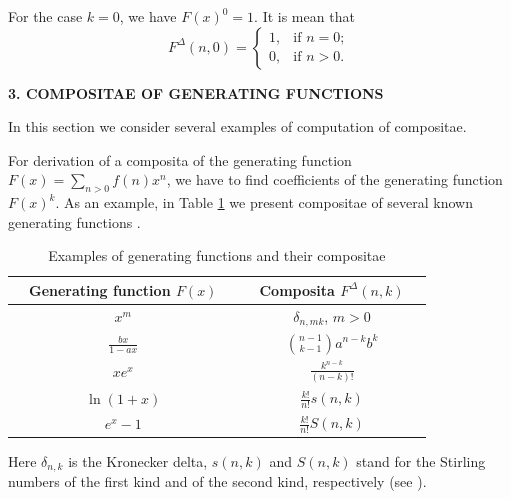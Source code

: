 \documentclass[12pt]{article}
\begin{document}
\begin{remark}
For the case $k=0$, we have $F(x)^0=1$. It is mean that 
\begin{equation}
F^{\Delta}(n,0)=\begin{cases}
1, & \text{if $n=0$};\\
0, & \text{if $n>0$}.
\end{cases}
\end{equation}
\end{remark}

\vspace{1.5cc}
\begin{center}
{\bf 3. COMPOSITAE OF GENERATING FUNCTIONS}
\end{center}

In this section we consider several examples of computation of compositae.

For derivation of a composita of the generating function $F(x)=\sum_{n>0} f(n)x^n$, we have to find coefficients of the generating function $F(x)^k$. As an example, in Table \ref{Tabl1_compositae} we present compositae of  several known generating functions \cite{Stanley_v2,ConcreteMath, Comtet}.

\begin{table}[h]
\begin{center}
\setlength\arrayrulewidth{1pt}
\renewcommand{\arraystretch}{1,3}
\begin{tabular}{|ccc|ccc|}
\hline
&\textbf{Generating function $F(x)$}& & & \textbf{Composita $F^{\Delta}(n,k)$}&\\
\hline
&$x^m$ &&& $\delta_{n,mk}$, $m>0$&\\ \hline
&$\frac{bx}{1-ax}$ &&&$\binom{n-1}{k-1}a^{n-k}b^k$&\\  \hline
&$xe^x$ &&&$\frac{k^{n-k}}{(n-k)!}$&\\  \hline
&$\ln(1+x)$ &&& $\frac{k!}{n!}s(n,k)$& \\ \hline
&$e^x-1$  &&& $\frac{k!}{n!}S(n,k)$& \\ \hline
\end{tabular}
\caption{Examples of generating functions and their compositae}
\label{Tabl1_compositae}
\end{center}
\end{table}

Here  $\delta_{n,k}$ is the Kronecker delta, $s(n,k)$ and $S(n,k)$ stand for the Stirling numbers of the first kind and of the second kind, respectively (see \cite{Comtet,ConcreteMath}).
\end{document}
